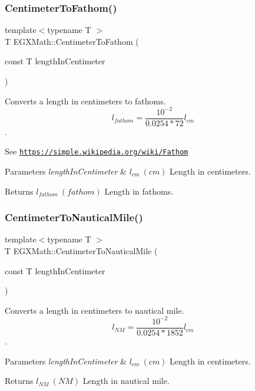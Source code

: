\subsubsection{\texorpdfstring{Centimeter\+To\+Fathom()}{CentimeterToFathom()}}
{\footnotesize\ttfamily template$<$typename T $>$ \\
T E\+G\+X\+Math\+::\+Centimeter\+To\+Fathom (\begin{DoxyParamCaption}\item[{const T}]{length\+In\+Centimeter }\end{DoxyParamCaption})}



Converts a length in centimeters to fathoms. \[ l_{fathom}= \frac{10^{-2}}{0.0254 * 72} l_{cm} \]. 

See \href{https://simple.wikipedia.org/wiki/Fathom}{\tt https\+://simple.\+wikipedia.\+org/wiki/\+Fathom} 
\begin{DoxyParams}{Parameters}
{\em length\+In\+Centimeter} & $ l_{cm}\ (cm)$ Length in centimeters. \\
\hline
\end{DoxyParams}
\begin{DoxyReturn}{Returns}
$ l_{fathom}\ (fathom)$ Length in fathoms. 
\end{DoxyReturn}
\mbox{\label{group___e_g_x_math-_conversions-_length_conversions-_centimeter-_nautical_ga65cf4453e28b375ee5c52389620939c6}} 
\subsubsection{\texorpdfstring{Centimeter\+To\+Nautical\+Mile()}{CentimeterToNauticalMile()}}
{\footnotesize\ttfamily template$<$typename T $>$ \\
T E\+G\+X\+Math\+::\+Centimeter\+To\+Nautical\+Mile (\begin{DoxyParamCaption}\item[{const T}]{length\+In\+Centimeter }\end{DoxyParamCaption})}



Converts a length in centimeters to nautical mile. \[ l_{NM}= \frac{10^{-2}}{0.0254 * 1852} l_{cm} \]. 


\begin{DoxyParams}{Parameters}
{\em length\+In\+Centimeter} & $ l_{cm}\ (cm)$ Length in centimeters. \\
\hline
\end{DoxyParams}
\begin{DoxyReturn}{Returns}
$ l_{NM}\ (NM)$ Length in nautical mile. 
\end{DoxyReturn}
